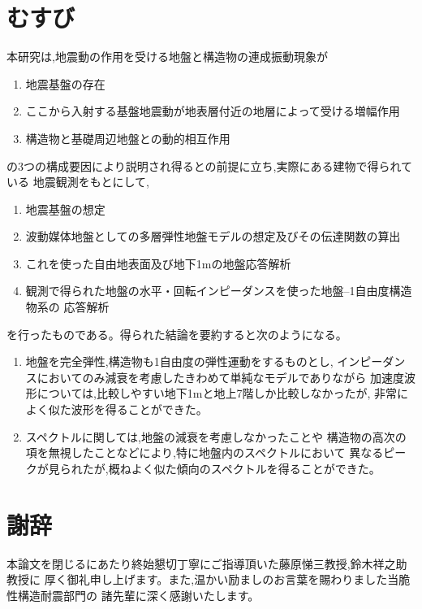 \documentclass[titlepage]{jsarticle}
\begin{document}
\section{むすび}
本研究は,地震動の作用を受ける地盤と構造物の連成振動現象が
\begin{enumerate}
\item 地震基盤の存在
\item ここから入射する基盤地震動が地表層付近の地層によって受ける増幅作用
\item 構造物と基礎周辺地盤との動的相互作用
\end{enumerate}
の3つの構成要因により説明され得るとの前提に立ち,実際にある建物で得られている
地震観測をもとにして,
\begin{enumerate}
\item 地震基盤の想定
\item 波動媒体地盤としての多層弾性地盤モデルの想定及びその伝達関数の算出
\item これを使った自由地表面及び地下1mの地盤応答解析
\item 観測で得られた地盤の水平・回転インピーダンスを使った地盤--1自由度構造物系の
応答解析
\end{enumerate}
を行ったものである。得られた結論を要約すると次のようになる。
\begin{enumerate}
\item 地盤を完全弾性,構造物も1自由度の弾性運動をするものとし,
インピーダンスにおいてのみ減衰を考慮したきわめて単純なモデルでありながら
加速度波形については,比較しやすい地下1mと地上7階しか比較しなかったが,
非常によく似た波形を得ることができた。
\item スペクトルに関しては,地盤の減衰を考慮しなかったことや
構造物の高次の項を無視したことなどにより,特に地盤内のスペクトルにおいて
異なるピークが見られたが,概ねよく似た傾向のスペクトルを得ることができた。
\end{enumerate}

\section{謝辞}
本論文を閉じるにあたり終始懇切丁寧にご指導頂いた藤原悌三教授,鈴木祥之助教授に
厚く御礼申し上げます。また,温かい励ましのお言葉を賜わりました当脆性構造耐震部門の
諸先輩に深く感謝いたします。
\pagebreak



\end{document}
